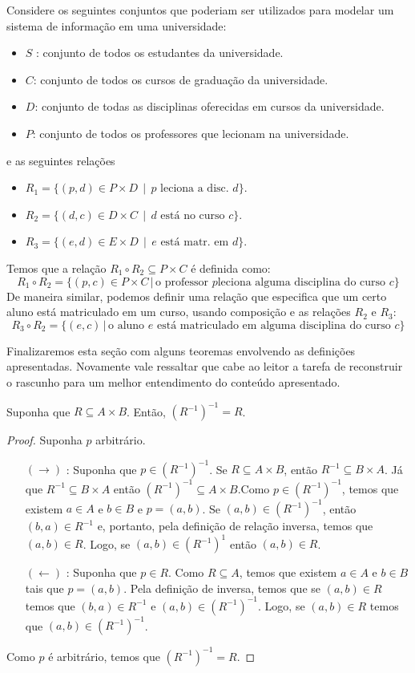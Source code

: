\begin{Example}
Considere os seguintes conjuntos que poderiam ser utilizados para
modelar um sistema de informação em uma universidade:
\begin{itemize}
  \item $S$ : conjunto de todos os estudantes da universidade.
  \item $C$: conjunto de todos os cursos de graduação da universidade.
  \item $D$: conjunto de todas as disciplinas oferecidas em cursos da
    universidade.
  \item $P$: conjunto de todos os professores que lecionam na universidade.
\end{itemize}
e as seguintes relações
\begin{itemize}
	\item $R_1 = \{(p,d)\in P \times D \,\mid\,\text{$p$ leciona a disc. } d\}$.
	\item $R_2 = \{(d,c)\in D \times C\,\mid\,\text{$d$ est\'a no curso $c$}\}$.
	\item $R_3 = \{(e,d)\in E\times D\,\mid\,\text{$e$ est\'a matr. em $d$}\}$.
\end{itemize}
Temos que a relação $R_1 \circ R_2 \subseteq P \times C$ é definida
como:
\[
R_1 \circ R_2 =\{(p,c) \in P \times C \,|\,\text{o professor $p$
  leciona alguma disciplina do curso $c$}\}
\]
De maneira similar, podemos definir uma relação que especifica que um
certo aluno está matriculado em um curso, usando composição e as
relações $R_2$ e $R_3$:
\[
R_3 \circ R_2 =\{(e,c)\,|\,\text{o aluno $e$ está matriculado em
  alguma disciplina do curso $c$}\}
\]
\end{Example}

Finalizaremos esta seção com alguns teoremas envolvendo as definições
apresentadas. Novamente vale ressaltar que cabe ao leitor a tarefa de
reconstruir o rascunho para um melhor entendimento do conteúdo
apresentado.

\begin{Theorem}
Suponha que $R \subseteq A \times B$. Então, $(R^{-1})^{-1} = R$.
\end{Theorem}
\begin{proof}
Suponha $p$ arbitrário.
\begin{itemize}
  \item[$(\to)$]: Suponha que $p\in (R^{-1})^{-1}$. Se $R\subseteq A
    \times B$, então $R^{-1}\subseteq B\times A$. Já que
    $R^{-1}\subseteq B\times A$ então $(R^{-1})^{-1}\subseteq A\times
    B$.Como $p\in (R^{-1})^{-1}$, temos que existem $a\in A$ e $b\in
    B$ e $p = (a,b)$. Se $(a,b) \in (R^{-1})^{-1}$, então $(b,a)\in
    R^{-1}$ e, portanto, pela definição de relação inversa, temos que
    $(a,b)\in R$. Logo, se $(a,b)\in
    (R^{-1})^{1}$ então $(a,b)\in R$.
  \item[$(\leftarrow)$]: Suponha que $p \in R$. Como $R\subseteq A$,
    temos que existem $a\in A$ e $b\in B$ tais que $p = (a,b)$. Pela
    definição de inversa, temos que se $(a,b)\in R$ temos que $(b,a)
    \in R^{-1}$ e $(a,b) \in (R^{-1})^{-1}$. Logo, se $(a,b) \in R$
    temos que $(a,b) \in (R^{-1})^{-1}$.
\end{itemize}
   Como $p$ é arbitrário, temos que $(R^{-1})^{-1} = R$.
\end{proof}